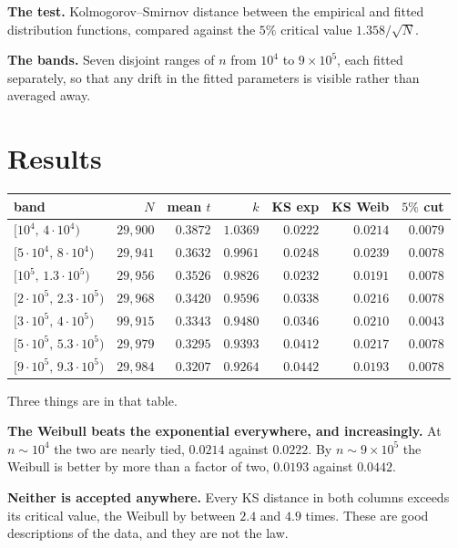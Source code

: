 \documentclass[12pt,a4paper]{article}
\begin{document}
\textbf{The test.} Kolmogorov--Smirnov distance between the empirical and fitted distribution functions, compared against the $5\%$ critical value $1.358/\sqrt{N}$.

\textbf{The bands.} Seven disjoint ranges of $n$ from $10^4$ to $9\times 10^5$, each fitted separately, so that any drift in the fitted parameters is visible rather than averaged away.

\section{Results}

\begin{center}
\begin{tabular}{lrrrrrr}
\toprule
band & $N$ & mean $t$ & $k$ & KS exp & KS Weib & $5\%$ cut \\
\midrule
$[10^4,\,4\!\cdot\!10^4)$      & $29{,}900$ & $0.3872$ & $1.0369$ & $0.0222$ & $0.0214$ & $0.0079$ \\
$[5\!\cdot\!10^4,\,8\!\cdot\!10^4)$ & $29{,}941$ & $0.3632$ & $0.9961$ & $0.0248$ & $0.0239$ & $0.0078$ \\
$[10^5,\,1.3\!\cdot\!10^5)$    & $29{,}956$ & $0.3526$ & $0.9826$ & $0.0232$ & $0.0191$ & $0.0078$ \\
$[2\!\cdot\!10^5,\,2.3\!\cdot\!10^5)$ & $29{,}968$ & $0.3420$ & $0.9596$ & $0.0338$ & $0.0216$ & $0.0078$ \\
$[3\!\cdot\!10^5,\,4\!\cdot\!10^5)$   & $99{,}915$ & $0.3343$ & $0.9480$ & $0.0346$ & $0.0210$ & $0.0043$ \\
$[5\!\cdot\!10^5,\,5.3\!\cdot\!10^5)$ & $29{,}979$ & $0.3295$ & $0.9393$ & $0.0412$ & $0.0217$ & $0.0078$ \\
$[9\!\cdot\!10^5,\,9.3\!\cdot\!10^5)$ & $29{,}984$ & $0.3207$ & $0.9264$ & $0.0442$ & $0.0193$ & $0.0078$ \\
\bottomrule
\end{tabular}
\end{center}

Three things are in that table.

\textbf{The Weibull beats the exponential everywhere, and increasingly.} At $n\sim 10^4$ the two are nearly tied, $0.0214$ against $0.0222$. By $n\sim 9\times10^5$ the Weibull is better by more than a factor of two, $0.0193$ against $0.0442$.

\textbf{Neither is accepted anywhere.} Every KS distance in both columns exceeds its critical value, the Weibull by between $2.4$ and $4.9$ times. These are good descriptions of the data, and they are not the law.
\end{document}

